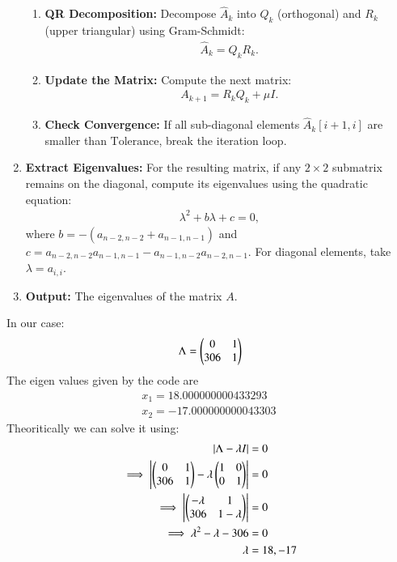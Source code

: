 \documentclass[journal]{IEEEtran}
\begin{document}
\begin{enumerate}
\begin{enumerate}
        \item \textbf{QR Decomposition:} Decompose $\hat{A}_k$ into $Q_k$ (orthogonal) and $R_k$ (upper triangular) using Gram-Schmidt:
        \begin{align}
        \hat{A}_k = Q_k R_k.
        \end{align}

        \item \textbf{Update the Matrix:} Compute the next matrix:
        \begin{align}
        A_{k+1} = R_k Q_k + \mu I.
        \end{align}

        \item \textbf{Check Convergence:} If all sub-diagonal elements $\hat{A}_k[i+1,i]$ are smaller than $\text{Tolerance}$, break the iteration loop.
    \end{enumerate}

    \item \textbf{Extract Eigenvalues:} 
    For the resulting matrix, if any $2 \times 2$ submatrix remains on the diagonal, compute its eigenvalues using the quadratic equation:
    \begin{align}
    \lambda^2 + b\lambda + c = 0,
    \end{align}
    where $b = -(a_{n-2,n-2} + a_{n-1,n-1})$ and $c = a_{n-2,n-2} a_{n-1,n-1} - a_{n-1,n-2} a_{n-2,n-1}$. For diagonal elements, take $\lambda = a_{i,i}$.

    \item \textbf{Output:} The eigenvalues of the matrix $A$.
\end{enumerate}
In our case:
\begin{align}
    \Lambda=\begin{pmatrix}0&1\\306&1\end{pmatrix}
\end{align}
The eigen values given by the code are
\begin{align}
	x_1 = 18.000000000433293\\
	x_2 = -17.000000000043303\
\end{align}
Theoritically we can solve it using:
\begin{align}
    \left\vert\Lambda - \lambda I\right\vert&=0\\
    \implies \left\vert\begin{pmatrix}0&1\\306&1\end{pmatrix}-\lambda\begin{pmatrix}1&0\\0&1\end{pmatrix}\right\vert&=0\\
    \implies \left\vert\begin{pmatrix}-\lambda&1\\306&1-\lambda\end{pmatrix}\right\vert&=0\\
    \implies \lambda^2-\lambda-306&=0\\
    \lambda&= 18,-17
\end{align}
\end{document}
